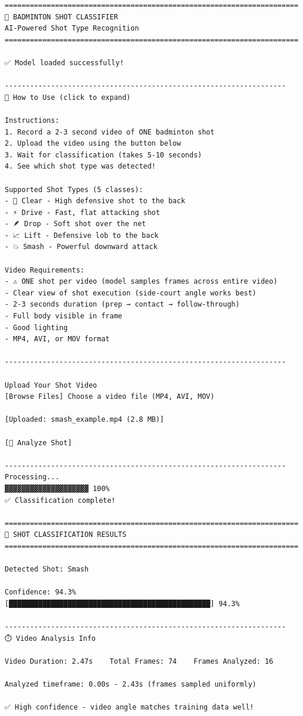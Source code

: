 \documentclass[11pt,a4paper]{article}
\begin{document}
\begin{verbatim}
======================================================================
🏸 BADMINTON SHOT CLASSIFIER
AI-Powered Shot Type Recognition
======================================================================

✅ Model loaded successfully!

-------------------------------------------------------------------
📖 How to Use (click to expand)

Instructions:
1. Record a 2-3 second video of ONE badminton shot
2. Upload the video using the button below
3. Wait for classification (takes 5-10 seconds)
4. See which shot type was detected!

Supported Shot Types (5 classes):
- 🎯 Clear - High defensive shot to the back
- ⚡ Drive - Fast, flat attacking shot
- 🪶 Drop - Soft shot over the net
- 📈 Lift - Defensive lob to the back
- 💥 Smash - Powerful downward attack

Video Requirements:
- ⚠️ ONE shot per video (model samples frames across entire video)
- Clear view of shot execution (side-court angle works best)
- 2-3 seconds duration (prep → contact → follow-through)
- Full body visible in frame
- Good lighting
- MP4, AVI, or MOV format

-------------------------------------------------------------------

Upload Your Shot Video
[Browse Files] Choose a video file (MP4, AVI, MOV)

[Uploaded: smash_example.mp4 (2.8 MB)]

[🚀 Analyze Shot]

-------------------------------------------------------------------
Processing...
▓▓▓▓▓▓▓▓▓▓▓▓▓▓▓▓▓▓▓▓ 100%
✅ Classification complete!

======================================================================
🎯 SHOT CLASSIFICATION RESULTS
======================================================================

Detected Shot: Smash

Confidence: 94.3%
[████████████████████████████████████████████████] 94.3%

-------------------------------------------------------------------
⏱️ Video Analysis Info

Video Duration: 2.47s    Total Frames: 74    Frames Analyzed: 16

Analyzed timeframe: 0.00s - 2.43s (frames sampled uniformly)

✅ High confidence - video angle matches training data well!


\end{verbatim}
\end{document}
